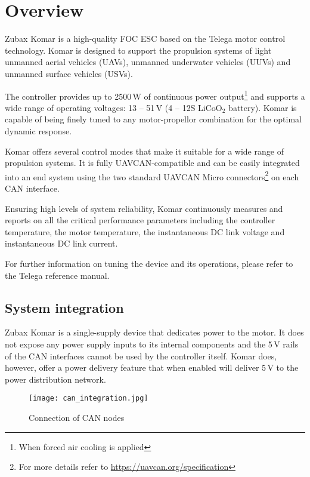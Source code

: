 \chapter{Overview}

Zubax Komar is a high-quality FOC ESC based on the Telega motor control technology. Komar is designed 
to support the propulsion systems of light unmanned aerial vehicles (UAVs), unmanned underwater vehicles (UUVs)
and unmanned surface vehicles (USVs).

The controller provides up to 2500\,W of continuous power output\footnote{When forced air cooling is applied} and
supports a wide range of operating voltages: 13 -- 51\,V (4 -- 12S $\text{LiCoO}_\text{2}$ battery).
Komar is capable of being finely tuned to any motor-propellor combination for the optimal dynamic response.

Komar offers several control modes that make it suitable for a wide range of propulsion systems.
It is fully UAVCAN-compatible and can be easily integrated into an end system using the two standard UAVCAN
Micro connectors\footnote{For more details refer to \url{https://uavcan.org/specification}} on each CAN
interface.

Ensuring high levels of system reliability, Komar continuously measures and reports on all the critical
performance parameters including the controller temperature, the motor temperature, the instantaneous
DC link voltage and instantaneous DC link current.

For further information on tuning the device and its operations, please refer to the Telega reference manual.

\section{System integration}
Zubax Komar is a single-supply device that dedicates power to the motor. It does not expose any power supply
inputs to its internal components and the 5\,V rails of the CAN interfaces cannot be used by the controller
itself. Komar does, however, offer a power delivery feature that when enabled will deliver 5\,V to the power
distribution network.

\begin{figure}[h]
    \centering
    \texttt{[image: can\_integration.jpg]}
    \caption{Connection of CAN nodes}
\end{figure}
